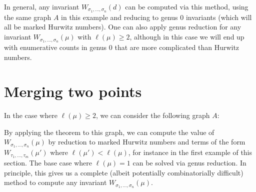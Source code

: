 \documentclass[thesis]{thesis-umich}           %
\theoremstyle{definition}
\begin{document}
In general, any invariant $W_{\sigma_1,\dots,\sigma_n}(d)$ can be computed via this method, using the
same graph $A$ in this example and reducing to genus $0$ invariants (which will all be marked
Hurwitz numbers). One can also apply genus reduction for any
invariant $W_{\sigma_1,\dots,\sigma_n}(\mu)$ with $\ell(\mu)\geq 2$, although in
this case we will end up with enumerative counts in genus $0$ that
are more complicated than Hurwitz numbers.

  \section{Merging two points}

  In the case where $\ell(\mu)\geq 2$, we can consider the following graph $A$:


                By applying the theorem to this graph, we can compute the value of
                $W_{\sigma_1,\dots,\sigma_n}(\mu)$ by reduction to marked Hurwitz
                numbers and terms of the form
                $W_{\tau_1,\dots,\tau_m}(\mu')$ where $\ell(\mu')<\ell(\mu)$, for instance
                in the first example of this section.
                The base case where $\ell(\mu)=1$ can be solved via genus reduction.
                In principle, this gives us a complete (albeit potentially combinatorially difficult) method to compute any invariant $W_{\sigma_1,\dots,\sigma_n}(\mu)$.
\end{document}
